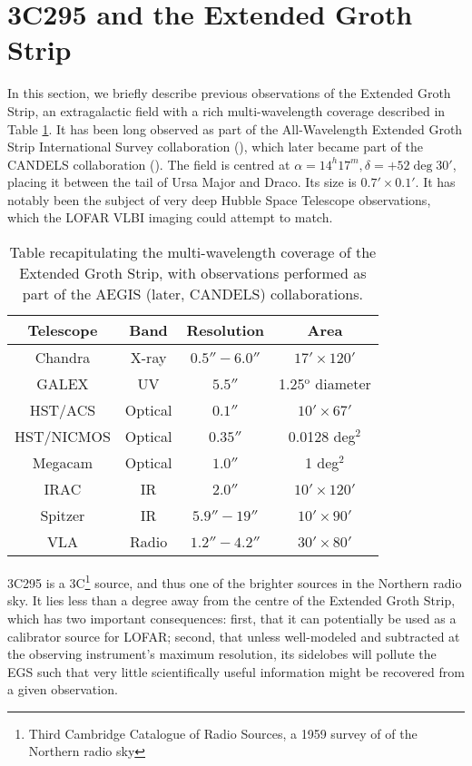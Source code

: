 \section{3C295 and the Extended Groth Strip}

\pg
In this section, we briefly describe previous observations of the Extended Groth Strip, an extragalactic field with a rich multi-wavelength coverage described in Table \ref{table.EGS.observation}. It has been long observed as part of the All-Wavelength Extended Groth Strip International Survey collaboration (), which later became part of the CANDELS collaboration (). The field is centred at $\alpha=14^h17^m,\delta=+52\deg 30'$, placing it between the tail of Ursa Major and Draco. Its size is $0.7'\times 0.1'$. It has notably been the subject of very deep Hubble Space Telescope observations, which the LOFAR VLBI imaging could attempt to match. 

\begin{table}[h!]
\begin{tabular}{cccc}
Telescope    & Band    & Resolution  & Area \\\hline
Chandra      & X-ray   & $0.5''-6.0''$ & $17'\times 120'$ \\
GALEX        & UV      & $5.5''      $ & 1.25$^\text{o}$ diameter \\
HST/ACS      & Optical & $0.1''      $ & $10' \times 67'$\\
HST/NICMOS   & Optical & $0.35''     $ & 0.0128 deg$^2$\\
Megacam      & Optical & $1.0''      $ & 1 deg$^2$\\
IRAC         & IR      & $2.0''      $ & $10' \times 120'$ \\
Spitzer      & IR      & $5.9''-19'' $ & $10'\times 90'$\\
VLA          & Radio   & $1.2''-4.2''$ & $30' \times 80'$
\end{tabular}
\caption{\label{table.EGS.observation}Table recapitulating the multi-wavelength coverage of the Extended Groth Strip, with observations performed as part of the AEGIS (later, CANDELS) collaborations.}
\end{table}

\pg
3C295 is a 3C\footnote{Third Cambridge Catalogue of Radio Sources, a 1959 survey of of the Northern radio sky} source, and thus one of the brighter sources in the Northern radio sky. It lies less than a degree away from the centre of the Extended Groth Strip, which has two important consequences: first, that it can potentially be used as a calibrator source for LOFAR; second, that unless well-modeled and subtracted at the observing instrument's maximum resolution, its sidelobes will pollute the EGS such that very little scientifically useful information might be recovered from a given observation.

